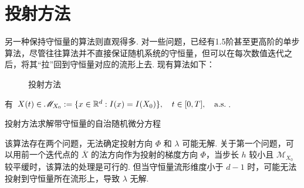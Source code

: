 \newpage



\section{投射方法}
另一种保持守恒量的算法则直观得多. 对一些问题，已经有1.5阶甚至更高阶的单步算法，尽管往往算法并不直接保证随机系统的守恒量，但可以在每次数值迭代之后，将其“拉”回到守恒量对应的流形上去. 现有算法如下：


\begin{figure}[!htbp]
	\centering 
	\vspace{.2cm}
	\caption{投射方法}
	\label{fig.5}
\end{figure}

有 $X(t) \in \mathscr M_{X_0} := \{ x\in\mathbb{R}^d : I(x) = I(X_0) \},\quad t\in[0,T],\quad \rm{a.s.}$.



\begin{algorithm}[!htbp]
	\caption{投射方法求解带守恒量的自治随机微分方程}%
	\LinesNumbered %
\end{algorithm}


该算法存在两个问题，无法确定投射方向 $\Phi$ 和 $\lambda$ 可能无解. 关于第一个问题，可以用前一个迭代点的 $\overline X$ 的法方向作为投射的梯度方向 $\Phi$，当步长 $h$ 较小且 $\mathscr M_{X_0}$ 较平缓时，该算法的处理是可行的. 但当守恒量流形维度小于 $d-1$ 时，可能无法投射到守恒量所在流形上，导致 $\lambda$ 无解. 

